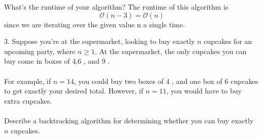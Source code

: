 \documentclass[11pt]{article}
\theoremstyle{definition}  %
\newcommand{\block}[2]{\begin{tcolorbox}[title={#1}]{#2}\end{tcolorbox}}
\begin{document}
What's the runtime of your algorithm? The runtime of this algorithm is $$\mathcal{O}(n-3)=\mathcal{O}(n)$$ since we are iterating over the given value n a single time.
\pagebreak
\block{Question 3}{
3. Suppose you're at the supermarket, looking to buy exactly $n$ cupcakes for an upcoming party, where $n \geq 1$. At the supermarket, the only cupcakes you can buy come in boxes of 4,6 , and 9 . \\\\For example, if $n=14$, you could buy two boxes of 4 , and one box of 6 cupcakes to get exactly your desired total. However, if $n=11$, you would have to buy extra cupcakes. \\\\Describe a backtracking algorithm for determining whether you can buy exactly $n$ cupcakes.}
\end{document}
